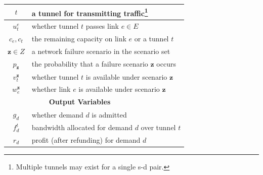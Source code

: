 \documentclass[sigconf]{acmart}
\begin{document}
\begin{table}[h!]
\begin{tabular}{ccccccc}
\hline
$t$ &\multicolumn{6}{|l}{a tunnel for transmitting traffic\footnote{Multiple tunnels may exist for a single s-d pair.}}\\
\hline
$u_t^e$ &\multicolumn{6}{|l}{whether tunnel $t$ passes link $e \in E$}\\
\hline
$c_e, c_t$ &\multicolumn{6}{|l}{the remaining capacity on link $e$ or a tunnel $t$}\\
\hline
$\mathbf{z}\in Z$ &\multicolumn{6}{|l}{a network failure scenario in the scenario set}\\
\hline
$p_{\mathbf{z}}$ &\multicolumn{6}{|l}{the probability that a failure scenario $\mathbf{z}$ occurs}\\
\hline
$v_t^{\mathbf{z}}$ &\multicolumn{6}{|l}{whether tunnel $t$ is available under scenario $\mathbf{z}$}\\
 \hline
$w_e^{ \mathbf{z}}$ &\multicolumn{6}{|l}{whether link $e$ is available under scenario $ \mathbf{z}$}\\
\hline

&\textbf{Output Variables}\\
\hline
$g_d$& \multicolumn{6}{|l}{whether demand $d$ is admitted}\\
\hline
$f_d^t$& \multicolumn{6}{|l}{bandwidth allocated for demand $d$ over tunnel $t$}\\
\hline
$r_d$& \multicolumn{6}{|l}{profit (after refunding)  for demand $d$}\\
\bottomrule
\bottomrule
\end{tabular}
\end{table}
\end{document}
